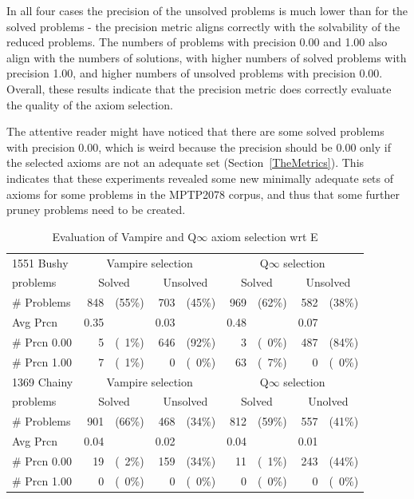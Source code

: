 \documentclass[EPiC]{easychair}
\begin{document}
In all four cases the precision of the unsolved problems is much lower than for 
the solved problems - the precision metric aligns correctly with the solvability 
of the reduced problems.
The numbers of problems with precision 0.00 and 1.00 also align with the numbers
of solutions, with higher numbers of solved problems with precision 1.00, and
higher numbers of unsolved problems with precision 0.00.
Overall, these results indicate that the precision metric does correctly
evaluate the quality of the axiom selection.

The attentive reader might have noticed that there are some solved problems with
precision 0.00, which is weird because the precision should be 0.00 only if the 
selected axioms are not an adequate set (Section~\ref{TheMetrics}).
This indicates that these experiments revealed some new minimally adequate 
sets of axioms for some problems in the MPTP2078 corpus, and thus that some 
further pruney problems need to be created.

\begin{table}[hbt]
\begin{center}
\begin{tabular}{|l|rr|rr|rr|rr|}
\hline
1551 Bushy      & \multicolumn{4}{|c|}{Vampire selection} & \multicolumn{4}{|c|}{Q$\infty$ selection} \\
problems        & \multicolumn{2}{|c|}{Solved} & \multicolumn{2}{|c|}{Unsolved} & \multicolumn{2}{|c|}{Solved} & \multicolumn{2}{|c|}{Unsolved} \\
\hline
\# Problems     &  848 & (55\%) &  703 & (45\%) &  969 & (62\%) &  582 & (38\%) \\
Avg Prcn        & 0.35 &        & 0.03 &        & 0.48 &        & 0.07 &        \\
\# Prcn 0.00    &    5 & (~1\%) &  646 & (92\%) &    3 & (~0\%) &  487 & (84\%) \\
\# Prcn 1.00    &    7 & (~1\%) &    0 & (~0\%) &   63 & (~7\%) &    0 & (~0\%) \\
\hline
\hline
1369 Chainy     & \multicolumn{4}{|c|}{Vampire selection} & \multicolumn{4}{|c|}{Q$\infty$ selection} \\
problems        & \multicolumn{2}{|c|}{Solved} & \multicolumn{2}{|c|}{Unsolved} & \multicolumn{2}{|c|}{Solved} & \multicolumn{2}{|c|}{Unolved} \\
\hline
\# Problems     &  901 & (66\%) &  468 & (34\%) &  812 & (59\%) &  557 & (41\%) \\
Avg Prcn        & 0.04 &        & 0.02 &        & 0.04 &        & 0.01 &        \\
\# Prcn 0.00    &   19 & (~2\%) &  159 & (34\%) &   11 & (~1\%) &  243 & (44\%) \\
\# Prcn 1.00    &    0 & (~0\%) &    0 & (~0\%) &    0 & (~0\%) &    0 & (~0\%) \\
\hline
\end{tabular}
\caption{Evaluation of Vampire and Q$\infty$ axiom selection wrt E}
\label{EvaluationOfMetrics}
\end{center}
\end{table}
\end{document}
